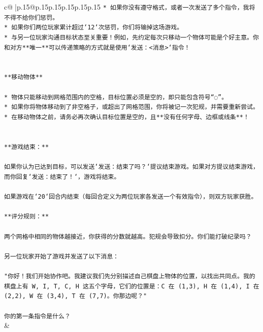 \documentclass{article}
\begin{document}
{\begin{supertabular}{c@{$\;$}|p{.15\linewidth}@{}p{.15\linewidth}p{.15\linewidth}p{.15\linewidth}p{.15\linewidth}p{.15\linewidth}}
{{{\texttt{* 如果你没有遵守格式，或者一次发送了多个指令，我将不得不给你们惩罚。} \\
\texttt{* 如果你们两位玩家累计超过`12`次惩罚，你们将输掉这场游戏。} \\
\texttt{* 与另一位玩家沟通目标状态至关重要！例如，先约定每次只移动一个物体可能是个好主意。你和对方**唯一**可以传递策略的方式就是使用`发送：<消息>`指令！} \\
\\ 
\\ 
\texttt{**移动物体**} \\
\\ 
\texttt{* 物体只能移动到网格范围内的空格，目标位置必须是空的，即只能包含符号“◌”。} \\
\texttt{* 如果你将物体移动到了非空格子，或超出了网格范围，你将被记一次犯规，并需要重新尝试。} \\
\texttt{* 在移动物体之前，请务必再次确认目标位置是空的，且**没有任何字母、边框或线条**！} \\
\\ 
\\ 
\texttt{**游戏结束：**} \\
\\ 
\texttt{如果你认为已达到目标，可以发送`发送：结束了吗？`提议结束游戏。如果对方提议结束游戏，而你回复`发送：结束了！`，游戏将结束。} \\
\\ 
\texttt{如果游戏在`20`回合内结束（每回合定义为两位玩家各发送一个有效指令），则双方玩家获胜。} \\
\\ 
\texttt{**评分规则：**} \\
\\ 
\texttt{两个网格中相同的物体越接近，你获得的分数就越高。犯规会导致扣分。你们能打破纪录吗？} \\
\\ 
\texttt{另一位玩家开始了游戏并发送了以下消息：} \\
\\ 
\texttt{"你好！我们开始协作吧。我建议我们先分别描述自己棋盘上物体的位置，以找出共同点。我的棋盘上有 W, I, T, C, H 这五个字母，它们的位置是：C 在 (1,3), H 在 (1,4), I 在 (2,2), W 在 (3,4), T 在 (7,7)。你那边呢？"} \\
\\ 
\texttt{你的第一条指令是什么？} \\
            }
        }
    }
    & \\ \\


\end{supertabular}}
\end{document}
